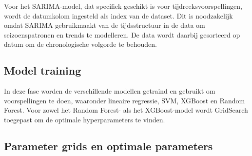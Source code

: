 \vspace{1em} 

Voor het SARIMA-model, dat specifiek geschikt is voor tijdreeksvoorspellingen, wordt de datumkolom ingesteld als index van de dataset. Dit is noodzakelijk omdat SARIMA gebruikmaakt van de tijdsstructuur in de data om seizoenspatronen en trends te modelleren. De data wordt daarbij gesorteerd op datum om de chronologische volgorde te behouden.

\subsection{Model training}


In deze fase worden de verschillende modellen getraind en gebruikt om voorspellingen te doen, waaronder lineaire regressie, SVM, XGBoost en Random Forest. Voor zowel het Random Forest- als het XGBoost-model wordt GridSearch toegepast om de optimale hyperparameters te vinden.

\subsection*{Parameter grids en optimale parameters}

